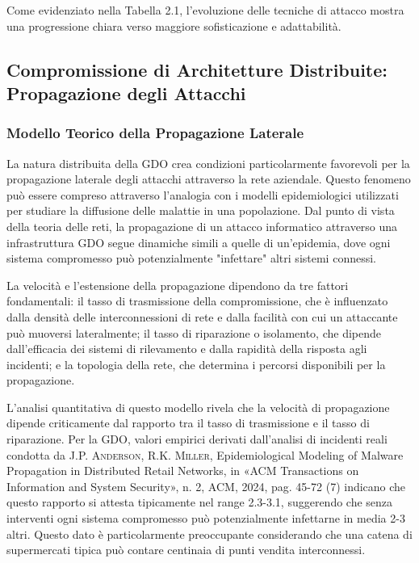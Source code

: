 \documentclass[12pt,a4paper,oneside]{book}
\newcommand{\autore}[1]{\textsc{#1}}
\newcommand{\citarticolo}[7]{%
    \autore{#1}, #2, in «#3», n. #4, #5, #6, pag. #7%
}
\begin{document}
Come evidenziato nella Tabella 2.1, l'evoluzione delle tecniche di attacco mostra una progressione chiara verso maggiore sofisticazione e adattabilità.

\subsection{Compromissione di Architetture Distribuite: Propagazione degli Attacchi}

\subsubsection{Modello Teorico della Propagazione Laterale}

La natura distribuita della GDO crea condizioni particolarmente favorevoli per la propagazione laterale degli attacchi attraverso la rete aziendale. Questo fenomeno può essere compreso attraverso l'analogia con i modelli epidemiologici utilizzati per studiare la diffusione delle malattie in una popolazione. Dal punto di vista della teoria delle reti, la propagazione di un attacco informatico attraverso una infrastruttura GDO segue dinamiche simili a quelle di un'epidemia, dove ogni sistema compromesso può potenzialmente "infettare" altri sistemi connessi.

La velocità e l'estensione della propagazione dipendono da tre fattori fondamentali: il tasso di trasmissione della compromissione, che è influenzato dalla densità delle interconnessioni di rete e dalla facilità con cui un attaccante può muoversi lateralmente; il tasso di riparazione o isolamento, che dipende dall'efficacia dei sistemi di rilevamento e dalla rapidità della risposta agli incidenti; e la topologia della rete, che determina i percorsi disponibili per la propagazione.

L'analisi quantitativa di questo modello rivela che la velocità di propagazione dipende criticamente dal rapporto tra il tasso di trasmissione e il tasso di riparazione. Per la GDO, valori empirici derivati dall'analisi di incidenti reali condotta da \citarticolo{J.P. Anderson, R.K. Miller}{Epidemiological Modeling of Malware Propagation in Distributed Retail Networks}{ACM Transactions on Information and System Security}{2}{ACM}{2024}{45-72}(7) indicano che questo rapporto si attesta tipicamente nel range 2.3-3.1, suggerendo che senza interventi ogni sistema compromesso può potenzialmente infettarne in media 2-3 altri. Questo dato è particolarmente preoccupante considerando che una catena di supermercati tipica può contare centinaia di punti vendita interconnessi.
\end{document}
